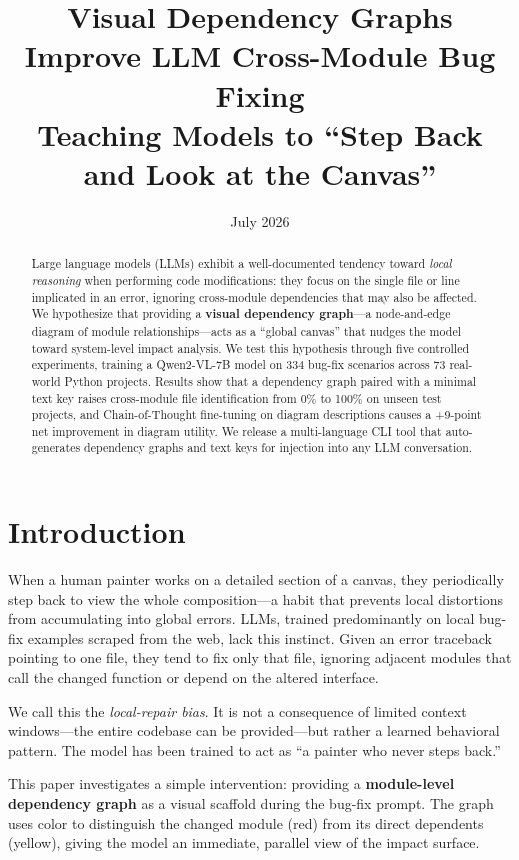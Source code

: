 \documentclass[11pt,a4paper]{article}
\title{\bfseries Visual Dependency Graphs Improve LLM Cross-Module Bug Fixing\\[3pt]
       \large Teaching Models to ``Step Back and Look at the Canvas''}
\author{}
\date{July 2026}
\begin{document}
\maketitle

\begin{abstract}
Large language models (LLMs) exhibit a well-documented tendency toward \textit{local reasoning} when performing code modifications: they focus on the single file or line implicated in an error, ignoring cross-module dependencies that may also be affected. We hypothesize that providing a \textbf{visual dependency graph}---a node-and-edge diagram of module relationships---acts as a ``global canvas'' that nudges the model toward system-level impact analysis. We test this hypothesis through five controlled experiments, training a Qwen2-VL-7B model on 334 bug-fix scenarios across 73 real-world Python projects. Results show that a dependency graph paired with a minimal text key raises cross-module file identification from 0\% to 100\% on unseen test projects, and Chain-of-Thought fine-tuning on diagram descriptions causes a +9-point net improvement in diagram utility. We release a multi-language CLI tool that auto-generates dependency graphs and text keys for injection into any LLM conversation.
\end{abstract}

\section{Introduction}

When a human painter works on a detailed section of a canvas, they periodically step back to view the whole composition---a habit that prevents local distortions from accumulating into global errors. LLMs, trained predominantly on local bug-fix examples scraped from the web, lack this instinct. Given an error traceback pointing to one file, they tend to fix only that file, ignoring adjacent modules that call the changed function or depend on the altered interface.

We call this the \textit{local-repair bias}. It is not a consequence of limited context windows---the entire codebase can be provided---but rather a learned behavioral pattern. The model has been trained to act as ``a painter who never steps back.''

This paper investigates a simple intervention: providing a \textbf{module-level dependency graph} as a visual scaffold during the bug-fix prompt. The graph uses color to distinguish the changed module (red) from its direct dependents (yellow), giving the model an immediate, parallel view of the impact surface.
\end{document}
